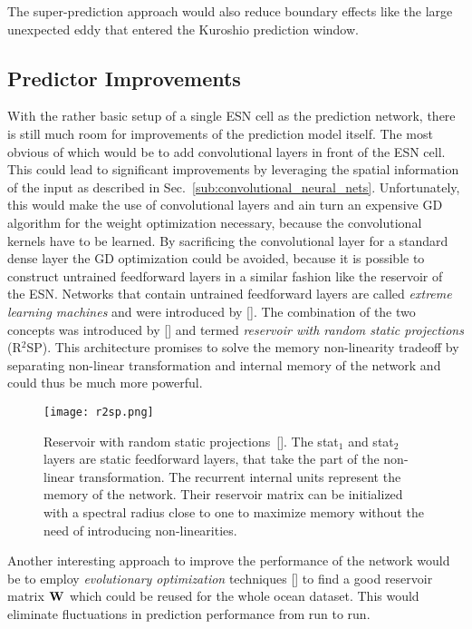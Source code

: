 The super-prediction approach would also reduce boundary effects like the
large unexpected eddy that entered the Kuroshio prediction window.


\subsection{Predictor Improvements}
With the rather basic setup of a single ESN cell as the prediction network,
there is still much room for improvements of the prediction model itself.  The
most obvious of which would be to add convolutional layers in front of the ESN
cell. This could lead to significant improvements by leveraging the spatial
information of the input as described in
Sec.~\ref{sub:convolutional_neural_nets}.  Unfortunately, this would make the
use of convolutional layers and ain turn an expensive GD algorithm for the
weight optimization necessary, because the convolutional kernels have to be
learned.  By sacrificing the convolutional layer for a standard dense layer the
GD optimization could be avoided, because it is possible to construct untrained
feedforward layers in a similar fashion like the reservoir of the ESN.
Networks that contain untrained feedforward layers are called \emph{extreme
learning machines} and were introduced by [\cite{huang2006}].  The combination
of the two concepts was introduced by [\cite{butcher2013}] and termed
\emph{reservoir with random static projections} (R$^2$SP).  This architecture
promises to solve the memory non-linearity tradeoff by separating non-linear
transformation and internal memory of the network and could thus be much more
powerful.

\begin{figure}
  \centering
  \texttt{[image: r2sp.png]}
  \caption{Reservoir with random static projections~[\cite{butcher2013}]. The
  stat$_1$ and stat$_2$ layers are static feedforward layers, that take the
  part of the non-linear transformation.  The recurrent internal units
  represent the memory of the network. Their reservoir matrix can be
  initialized with a spectral radius close to one to maximize memory without
  the need of introducing non-linearities.}
  \label{fig:r2sp}
\end{figure}

Another interesting approach to improve the performance of the network would be
to employ \emph{evolutionary optimization} techniques [\cite{fogel1997}] to find
a good reservoir matrix $\boldsymbol{\textbf{W}}^{\text{}}$ which could be reused for the whole ocean
dataset.  This would eliminate fluctuations in prediction performance from run
to run.


